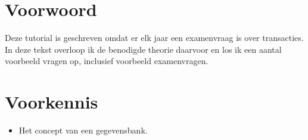 \documentclass[transacties.tex]{subfiles}
\begin{document}
\section*{Voorwoord}
Deze tutorial is geschreven omdat er elk jaar een examenvraag is over transacties. In deze tekst overloop ik de benodigde theorie daarvoor en los ik een aantal voorbeeld vragen op, inclusief voorbeeld examenvragen.

\section*{Voorkennis}
\begin{itemize}
\item Het concept van een gegevensbank.
\end{itemize}
\end{document}
